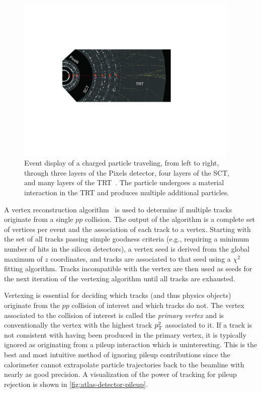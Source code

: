\begin{figure}[tp]
  \centering
  \includegraphics[width=0.95\textwidth]{figures/lhc-atlas/detector-display-ID}
  \caption{Event display of a charged particle traveling, from left to right, through three layers of the Pixels detector, four layers of the SCT, and many layers of the TRT~\cite{SUSY-2011-14}. The particle undergoes a material interaction in the TRT and produces multiple additional particles.}
  \label{fig:atlas-detector-display-ID}
\end{figure}

A vertex reconstruction algorithm~\cite{ATLAS-CONF-2010-069,ATLAS-CONF-2012-042} is used to determine if multiple tracks originate from a single $pp$ collision. The output of the algorithm is a complete set of vertices per event and the association of each track to a vertex. Starting with the set of all tracks passing simple goodness criteria (e.g., requiring a minimum number of hits in the silicon detectors), a vertex seed is derived from the global maximum of $z$ coordinates, and tracks are associated to that seed using a $\chi^2$ fitting algorithm. Tracks incompatible with the vertex are then used as seeds for the next iteration of the vertexing algorithm until all tracks are exhausted. 

Vertexing is essential for deciding which tracks (and thus physics objects) originate from the $pp$ collision of interest and which tracks do not. The vertex associated to the collision of interest is called the \textit{primary vertex} and is conventionally the vertex with the highest track $p_{\mathrm{T}}^2$ associated to it. If a track is not consistent with having been produced in the primary vertex, it is typically ignored as originating from a pileup interaction which is uninteresting. This is the best and most intuitive method of ignoring pileup contributions since the calorimeter cannot extrapolate particle trajectories back to the beamline with nearly as good precision. A visualization of the power of tracking for pileup rejection is shown in \cref{fig:atlas-detector-pileup}.

